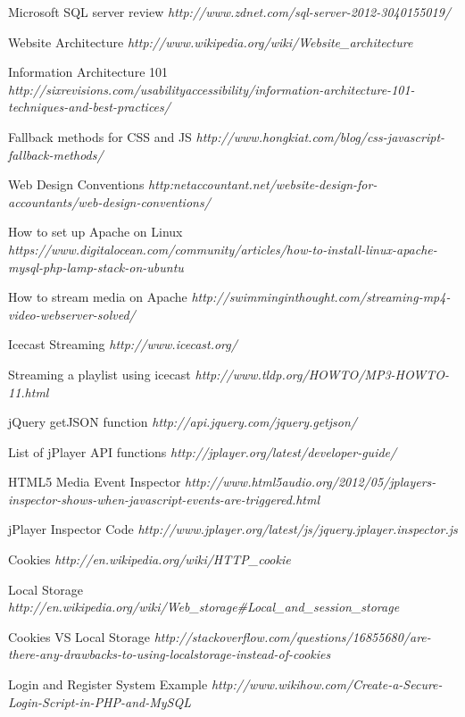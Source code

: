 \documentclass[a4paper, 12pt]{report}
\begin{document}
\begin{thebibliography}{9}
Microsoft SQL server review \emph{http://www.zdnet.com/sql-server-2012-3040155019/}

Website Architecture \emph{ http://www.wikipedia.org/wiki/Website\_architecture}

Information Architecture 101 \emph{http://sixrevisions.com/usabilityaccessibility/information-architecture-101-techniques-and-best-practices/}

Fallback methods for CSS and JS \emph{http://www.hongkiat.com/blog/css-javascript-fallback-methods/}

Web Design Conventions \emph{http:netaccountant.net/website-design-for-accountants/web-design-conventions/}

How to set up Apache on Linux \emph{https://www.digitalocean.com/community/articles/how-to-install-linux-apache-mysql-php-lamp-stack-on-ubuntu}

How to stream media on Apache \emph{http://swimminginthought.com/streaming-mp4-video-webserver-solved/}

Icecast Streaming \emph{http://www.icecast.org/}

Streaming a playlist using icecast \emph{http://www.tldp.org/HOWTO/MP3-HOWTO-11.html}

jQuery getJSON function \emph{http://api.jquery.com/jquery.getjson/}

List of jPlayer API functions \emph{http://jplayer.org/latest/developer-guide/}

HTML5 Media Event Inspector \emph{http://www.html5audio.org/2012/05/jplayers-inspector-shows-when-javascript-events-are-triggered.html}

jPlayer Inspector Code \emph{http://www.jplayer.org/latest/js/jquery.jplayer.inspector.js}

Cookies \emph{http://en.wikipedia.org/wiki/HTTP\_cookie}

Local Storage \emph{http://en.wikipedia.org/wiki/Web\_storage\#Local\_and\_session\_storage}

Cookies VS Local Storage \emph{http://stackoverflow.com/questions/16855680/are-there-any-drawbacks-to-using-localstorage-instead-of-cookies}

Login and Register System Example \emph{http://www.wikihow.com/Create-a-Secure-Login-Script-in-PHP-and-MySQL}


\end{thebibliography}
\end{document}
